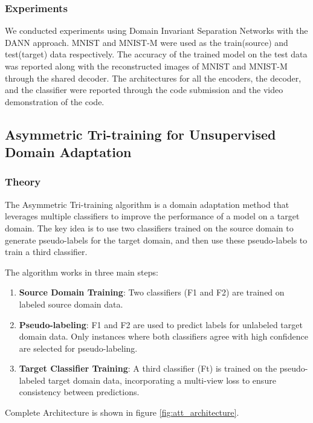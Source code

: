 \documentclass{article}
\begin{document}
\subsubsection{Experiments}
We conducted experiments using Domain Invariant Separation Networks with the DANN approach. MNIST and MNIST-M were used as the train(source) and test(target) data respectively. The accuracy of the trained model on the test data was reported along with the reconstructed images of MNIST and MNIST-M through the shared decoder. The architectures for all the encoders, the decoder, and the classifier were reported through the code submission and the video demonstration of the code.



\subsection{Asymmetric Tri-training for Unsupervised Domain Adaptation}
\subsubsection{Theory}
The Asymmetric Tri-training algorithm is a domain adaptation method that leverages multiple classifiers to improve the performance of a model on a target domain. The key idea is to use two classifiers trained on the source domain to generate pseudo-labels for the target domain, and then use these pseudo-labels to train a third classifier. 

The algorithm works in three main steps:

\begin{enumerate}
  \item \textbf{Source Domain Training}: Two classifiers (F1 and F2) are trained on labeled source domain data.
  
  \item \textbf{Pseudo-labeling}: F1 and F2 are used to predict labels for unlabeled target domain data. Only instances where both classifiers agree with high confidence are selected for pseudo-labeling.
  
  \item \textbf{Target Classifier Training}: A third classifier (Ft) is trained on the pseudo-labeled target domain data, incorporating a multi-view loss to ensure consistency between predictions.
\end{enumerate}

Complete Architecture is shown in figure \ref{fig:att_architecture}.
\end{document}
